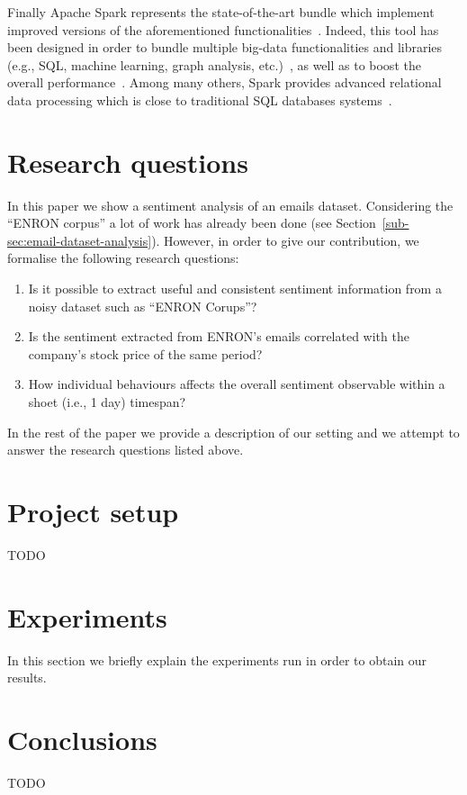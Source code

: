 \documentclass{vldb}
\begin{document}
Finally Apache Spark represents the state-of-the-art bundle which implement improved versions of the aforementioned functionalities~\cite{shoro2015big}.
Indeed, this tool has been designed in order to bundle multiple big-data functionalities and libraries (e.g., SQL, machine learning, graph analysis, etc.)~\cite{meng2015mllib}, as well as to boost the overall performance~\cite{gopalani2015comparing}.
Among many others, Spark provides advanced relational data processing which is close to traditional SQL databases systems~\cite{armbrust2015spark}. 


\section{Research questions}
\label{sec:r-q}
In this paper we show a sentiment analysis of an emails dataset.
Considering the ``ENRON corpus'' a lot of work has already been done (see Section~\ref{sub-sec:email-dataset-analysis}).
However, in order to give our contribution, we formalise the following research questions:
\begin{enumerate}
	\item Is it possible to extract useful and consistent sentiment information from a noisy dataset such as ``ENRON Corups''?
	\item Is the sentiment extracted from ENRON's emails correlated with the company's stock price of the same period?
	\item How individual behaviours affects the overall sentiment observable within a shoet (i.e., 1 day) timespan?
\end{enumerate}

In the rest of the paper we provide a description of our setting and we attempt to answer the research questions listed above.


\section{Project setup}
\label{sec:p-s}
TODO

\section{Experiments}
\label{sec:exp}
In this section we briefly explain the experiments run in order to obtain our results.
 

\section{Conclusions}
\label{sec:concl}
TODO
\end{document}
